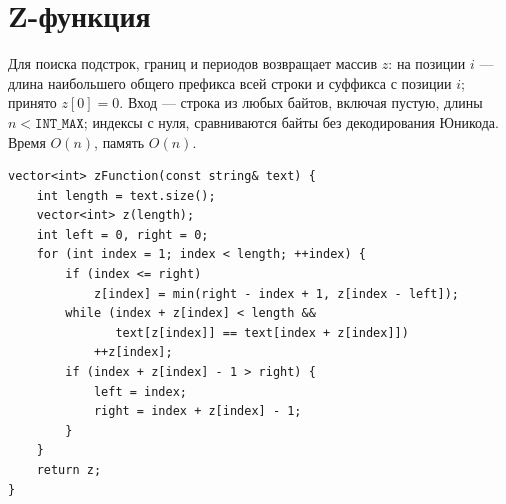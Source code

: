 \section{Z-функция}
Для поиска подстрок, границ и периодов возвращает массив $z$: на позиции $i$ --- длина наибольшего общего префикса всей строки и суффикса с позиции $i$; принято $z[0]=0$.
Вход --- строка из любых байтов, включая пустую, длины $n<\texttt{INT\_MAX}$; индексы с нуля, сравниваются байты без декодирования Юникода.
Время $O(n)$, память $O(n)$.
\begin{lstlisting}[name=str_z]
vector<int> zFunction(const string& text) {
    int length = text.size();
    vector<int> z(length);
    int left = 0, right = 0;
    for (int index = 1; index < length; ++index) {
        if (index <= right)
            z[index] = min(right - index + 1, z[index - left]);
        while (index + z[index] < length &&
               text[z[index]] == text[index + z[index]])
            ++z[index];
        if (index + z[index] - 1 > right) {
            left = index;
            right = index + z[index] - 1;
        }
    }
    return z;
}
\end{lstlisting}
%

